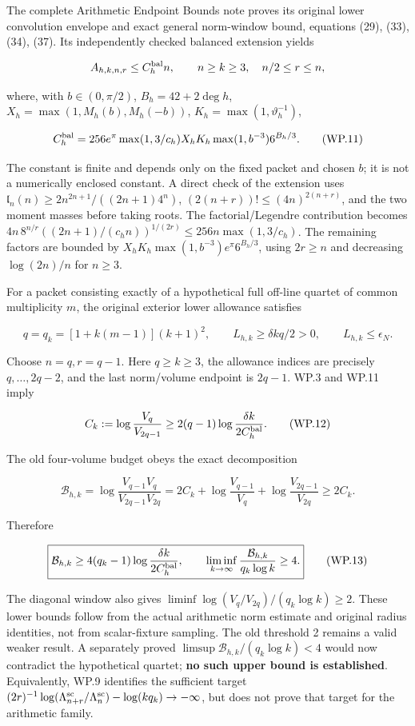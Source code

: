 The complete Arithmetic Endpoint Bounds note proves its original lower convolution envelope and exact general norm-window bound, equations (29), (33), (34), (37). Its independently checked balanced extension yields

\[
A_{h,k,n,r}\le C_h^{\rm bal}n,\qquad n\ge k\ge3,\quad n/2\le r\le n,
\]

where, with \(b\in(0,\pi/2)\), \(B_h=42+2\deg h\), \(X_h=\max(1,M_h(b),M_h(-b))\), \(K_h=\max(1,\vartheta_h^{-1})\),

\[
C_h^{\rm bal}=256e^\pi\max(1,3/c_h)X_hK_h\max(1,b^{-3})6^{B_h/3}.
\tag{WP.11}
\]

The constant is finite and depends only on the fixed packet and chosen \(b\); it is not a numerically enclosed constant. A direct check of the extension uses \(\mathfrak l_n(n)\ge2n^{2n+1}/((2n+1)4^n)\), \((2(n+r))!\le(4n)^{2(n+r)}\), and the two moment masses before taking roots. The factorial/Legendre contribution becomes \(4n\,8^{n/r}((2n+1)/(c_hn))^{1/(2r)}\le256n\max(1,3/c_h)\). The remaining factors are bounded by \(X_hK_h\max(1,b^{-3})e^\pi6^{B_h/3}\), using \(2r\ge n\) and decreasing \(\log(2n)/n\) for \(n\ge3\).

For a packet consisting exactly of a hypothetical full off-line quartet of common multiplicity \(m\), the original exterior lower allowance satisfies

\[
q=q_k=[1+k(m-1)](k+1)^2,\qquad L_{h,k}\ge\delta kq/2>0,
\qquad L_{h,k}\le\epsilon_N.
\]

Choose \(n=q,r=q-1\). Here \(q\ge k\ge3\), the allowance indices are precisely \(q,\ldots,2q-2\), and the last norm/volume endpoint is \(2q-1\). WP.3 and WP.11 imply

\[
C_k:=\log\frac{V_q}{V_{2q-1}}
\ge2(q-1)\log\frac{\delta k}{2C_h^{\rm bal}}. \tag{WP.12}
\]

The old four-volume budget obeys the exact decomposition

\[
\mathcal B_{h,k}=\log\frac{V_{q-1}V_q}{V_{2q-1}V_{2q}}
=2C_k+\log\frac{V_{q-1}}{V_q}+\log\frac{V_{2q-1}}{V_{2q}}\ge2C_k.
\]

Therefore

\[
\boxed{\mathcal B_{h,k}\ge4(q_k-1)\log\frac{\delta k}{2C_h^{\rm bal}},
\qquad \liminf_{k\to\infty}\frac{\mathcal B_{h,k}}{q_k\log k}\ge4.} \tag{WP.13}
\]

The diagonal window also gives \(\liminf\log(V_q/V_{2q})/(q_k\log k)\ge2\). These lower bounds follow from the actual arithmetic norm estimate and original radius identities, not from scalar-fixture sampling. The old threshold 2 remains a valid weaker result. A separately proved \(\limsup\mathcal B_{h,k}/(q_k\log k)<4\) would now contradict the hypothetical quartet; \textbf{no such upper bound is established}. Equivalently, WP.9 identifies the sufficient target \((2r)^{-1}\log(\Lambda_{n+r}^{\rm sc}/\Lambda_n^{\rm sc})-\log(kq_k)\to-\infty\), but does not prove that target for the arithmetic family.


